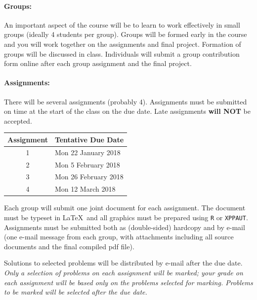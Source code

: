 \documentclass[12pt]{article}
\newcommand{\note}{\noindent{\bfseries\slshape Note:\/} }
\begin{document}
\paragraph*{Groups:} An important aspect of the course will be to learn to work effectively in small groups (ideally 4 students per group).  Groups will be formed early in the course and you will work together on the assignments and final project.  Formation of groups will be discussed in class.  Individuals will submit a group contribution form online after each group assignment and the final project.

\paragraph*{Assignments:} There will be several assignments (probably 4).  Assignments must be submitted on time at the start of the class on the due date.  Late assignments {\bf will NOT} be accepted.
%
\begin{center}
\begin{tabular}{c|l}
\bf Assignment & \bf Tentative Due Date \\\hline
1 & Mon 22 January 2018 \\
2 & Mon 5 February 2018 \\
3 & Mon 26 February 2018 \\
4 & Mon 12 March 2018 \\
\end{tabular}
\end{center}
%
\noindent
Each group will submit one joint document for each assignment.  The document must be typeset in \LaTeX\ and all graphics must be prepared using {\tt R} or {\tt XPPAUT}.  Assignments must be submitted both as (double-sided) hardcopy and by e-mail (one e-mail message from each group, with attachments including all source documents and the final compiled pdf file).

Solutions to selected problems will be distributed by e-mail after the due date.
\note \emph{Only a selection of problems on each assignment will be marked; your grade on each assignment will be based only on the problems selected for marking.  Problems to be marked will be selected after the due date.}

\end{document}
